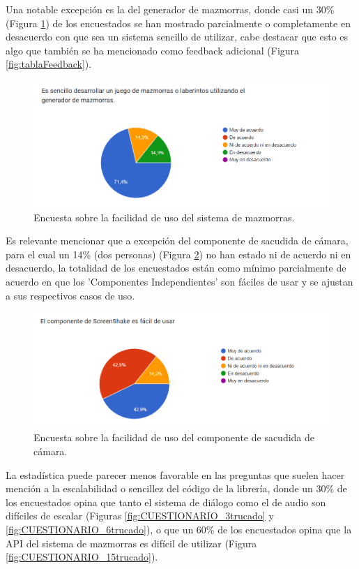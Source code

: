 Una notable excepción es la del generador de mazmorras, donde
 casi un 30\% (Figura \ref{fig:CUESTIONARIO_14trucado}) de los encuestados se han mostrado parcialmente o completamente en desacuerdo con que sea un sistema sencillo de utilizar, cabe destacar que esto es algo que 
 también se ha mencionado como feedback adicional (Figura \ref{fig:tablaFeedback}).

\begin{figure}[H]
  \centering
  \includegraphics[width=450px,clip=true]{CUESTIONARIO_14.png}
  \caption{Encuesta sobre la facilidad de uso del sistema de mazmorras.}
  \label{fig:CUESTIONARIO_14trucado}
\end{figure}
\raggedbottom

Es relevante mencionar que a excepción del componente de sacudida de cámara, para el cual un 14\% (dos personas) (Figura \ref{fig:CUESTIONARIO_26trucado}) no han estado ni de acuerdo ni en desacuerdo, la totalidad de 
los encuestados están como mínimo parcialmente de acuerdo en que los 'Componentes Independientes' son fáciles de usar y se ajustan a sus respectivos casos de uso.

\begin{figure}[H]
  \centering
  \includegraphics[width=450px,clip=true]{CUESTIONARIO_26.png}
  \caption{Encuesta sobre la facilidad de uso del componente de sacudida de cámara.}
  \label{fig:CUESTIONARIO_26trucado}
\end{figure}
\raggedbottom

La estadística puede parecer menos favorable en las preguntas que suelen hacer mención a la escalabilidad o sencillez del código de la librería, donde un 30\% de los encuestados opina que tanto el sistema de
 diálogo como el de audio son difíciles de escalar (Figuras \ref{fig:CUESTIONARIO_3trucado} y \ref{fig:CUESTIONARIO_6trucado}), o que un 60\% de los encuestados opina que la API del sistema de mazmorras es
  difícil de utilizar (Figura \ref{fig:CUESTIONARIO_15trucado}). 
  
